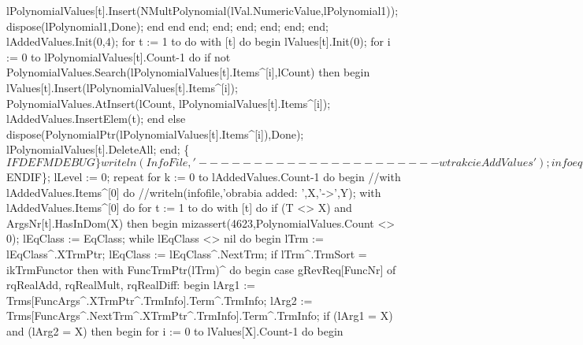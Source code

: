                               lPolynomialValues[t].Insert(NMultPolynomial(lVal.NumericValue,lPolynomial1));
                              dispose(lPolynomial1,Done);
                           end
                        end
                     end;
               end;
            end;
         end;
      end;
   end;
   lAddedValues.Init(0,4);
   for t := 1 to  do
      with [t] do
   begin
      lValues[t].Init(0);
      for i := 0 to lPolynomialValues[t].Count-1 do
         if not PolynomialValues.Search(lPolynomialValues[t].Items^[i],lCount) then
         begin
            lValues[t].Insert(lPolynomialValues[t].Items^[i]);
            PolynomialValues.AtInsert(lCount, lPolynomialValues[t].Items^[i]);
            lAddedValues.InsertElem(t);
         end
         else dispose(PolynomialPtr(lPolynomialValues[t].Items^[i]),Done);
      lPolynomialValues[t].DeleteAll;
   end;
   \{$IFDEF MDEBUG\}
   writeln(InfoFile,'---------------------- w trakcie AddValues');
   infoeqclasses;
   writeln(InfoFile,'---------------------- koniec wydruku w trakcie AddValues');
   \{$ENDIF\};
   lLevel := 0;
   repeat
      for k := 0 to lAddedValues.Count-1 do
      begin
         //with lAddedValues.Items^[0] do
         //writeln(infofile,'obrabia added: ',X,'->',Y);
         with lAddedValues.Items^[0] do
            for t := 1 to  do
               with [t] do
                  if (T <> X) and ArgsNr[t].HasInDom(X) then
                  begin
                     mizassert(4623,PolynomialValues.Count <> 0);
                     lEqClass := EqClass;
                     while lEqClass <> nil do
                     begin
                        lTrm := lEqClass^.XTrmPtr;
                        lEqClass := lEqClass^.NextTrm;
                        if lTrm^.TrmSort = ikTrmFunctor then
                           with FuncTrmPtr(lTrm)^ do
                        begin
                           case gRevReq[FuncNr] of
                              rqRealAdd, rqRealMult, rqRealDiff:
                                 begin
                                    lArg1 := Trms[FuncArgs^.XTrmPtr^.TrmInfo].Term^.TrmInfo;
                                    lArg2 := Trms[FuncArgs^.NextTrm^.XTrmPtr^.TrmInfo].Term^.TrmInfo;
                                    if (lArg1 = X) and (lArg2 = X) then
                                    begin
                                       for i := 0 to lValues[X].Count-1 do
                                       begin
